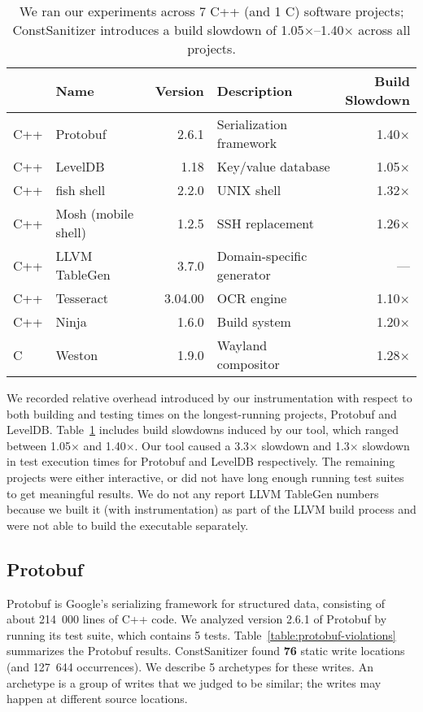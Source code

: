 \begin{table}[!htb]
  \centering
  \caption{We ran our experiments across 7 C++ (and 1 C) software projects;
           ConstSanitizer introduces a build slowdown of
           1.05$\times$--1.40$\times$ across all projects.}
  \label{table:projects}
  \begin{tabular}{l l r l r}
    & \textbf{Name} & \textbf{Version} & \textbf{Description}
    & \makecell[r]{\textbf{Build} \\ \textbf{Slowdown}}\\
    \midrule
    C++ & Protobuf & 2.6.1 & Serialization framework & 1.40$\times$\\
    C++ & LevelDB & 1.18 & Key/value database & 1.05$\times$\\
    C++ & fish shell & 2.2.0 & UNIX shell & 1.32$\times$\\
    C++ & Mosh (mobile shell) & 1.2.5 & SSH replacement & 1.26$\times$\\
    C++ & LLVM TableGen & 3.7.0 & Domain-specific generator & ---\phantom{\- $\times$} \\
    C++ & Tesseract & 3.04.00 & OCR engine & 1.10$\times$\\
    C++ & Ninja & 1.6.0 & Build system & 1.20$\times$\\
    C & Weston & 1.9.0 & Wayland compositor & 1.28$\times$\\
  \end{tabular}
\end{table}

We recorded relative overhead introduced by our instrumentation with respect to
both building and testing times on the longest-running projects, Protobuf and
LevelDB.
Table~\ref{table:projects} includes build slowdowns induced by our tool, which
ranged between 1.05$\times$ and 1.40$\times$.
Our tool caused a 3.3$\times$ slowdown and 1.3$\times$ slowdown in test
execution times for Protobuf and LevelDB respectively.
The remaining projects were either interactive, or did not have long enough
running test suites to get meaningful results.
We do not any report LLVM TableGen numbers because we built it (with
instrumentation) as part of the LLVM build process and were not able to build
the executable separately.

\subsection{Protobuf}

Protobuf is Google's serializing framework for structured data, consisting of
about 214~000 lines of C++ code.
We analyzed version 2.6.1 of Protobuf by running its test suite, which contains
5 tests.
Table~\ref{table:protobuf-violations} summarizes the Protobuf results.
ConstSanitizer found {\bf 76} static write locations (and 127~644 occurrences).
We describe 5 archetypes for these writes.
An archetype is a group of writes that we judged to be similar; the writes may
happen at different source locations.

